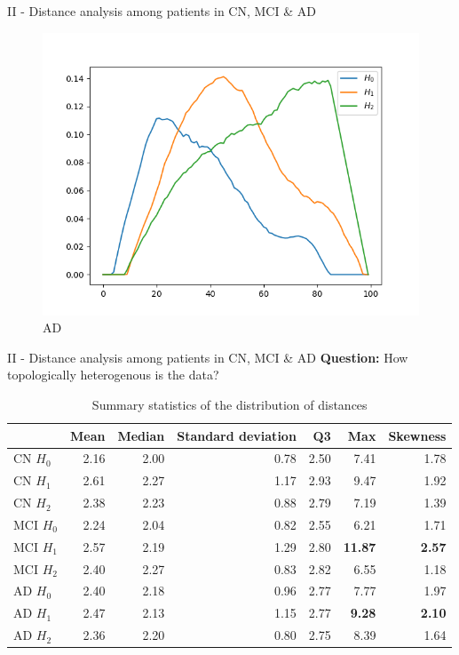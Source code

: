 \documentclass[aspectratio=169, 10pt, dvipsnames]{beamer}
\begin{document}
\begin{frame}[fragile]{II - Distance analysis among patients in CN, MCI \& AD}
  \begin{figure}
    \centering
    \includegraphics[width=\textwidth]{figures/median_pls/median_pl_AD.png}
    \caption{AD}
  \end{figure}
  \endminipage
\end{frame}

\begin{frame}[fragile]{II - Distance analysis among patients in CN, MCI \& AD}
\textbf{Question:} How topologically heterogenous is the data?
\begin{table}
\centering
\begin{tabular}{lrrrrrr}
\toprule
{} &  Mean &  Median &  Standard deviation &   Q3 &   Max &  Skewness \\
\midrule
CN $H_0$ & 2.16 & 2.00 & 0.78 & 2.50 & 7.41 & 1.78 \\
CN $H_1$ & 2.61 & 2.27 & 1.17 & 2.93 & 9.47 & 1.92 \\
CN $H_2$ & 2.38 & 2.23 & 0.88 & 2.79 & 7.19 & 1.39 \\
MCI $H_0$ & 2.24 & 2.04 & 0.82 & 2.55 & 6.21 & 1.71 \\
MCI $H_1$ & 2.57 & 2.19 & 1.29 & 2.80 & \textbf{11.87} & \textbf{2.57} \\
MCI $H_2$ & 2.40 & 2.27 & 0.83 & 2.82 & 6.55 & 1.18 \\
AD $H_0$ & 2.40 & 2.18 & 0.96 & 2.77 & 7.77 & 1.97 \\
AD $H_1$ & 2.47 & 2.13 & 1.15 & 2.77 & \textbf{9.28} & \textbf{2.10} \\
AD $H_2$ & 2.36 & 2.20 & 0.80 & 2.75 & 8.39 & 1.64 \\
  \bottomrule
\end{tabular}
\caption{Summary statistics of the distribution of distances }
\label{tab:stats_median_pl}
\end{table}
\end{frame}
\end{document}
